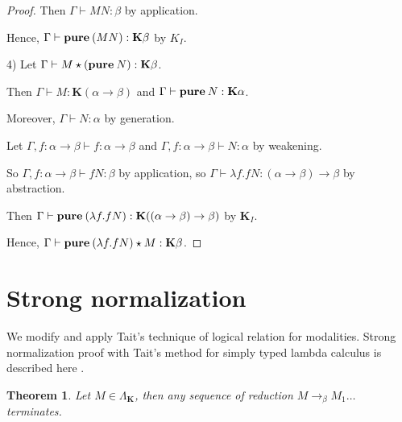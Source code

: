 \documentclass[a4paper]{article}
\newtheorem{theorem}{Theorem}
\begin{document}
\begin{proof}
  Then $\Gamma \vdash M N : \beta$ by application.

  Hence, $\Gamma \vdash {\bf pure \: } (M N) : \textbf{K}\beta$ by $K_I$.

\vspace{\baselineskip}

  4) Let $\Gamma \vdash M \star ({\bf pure \: } N) : \textbf{K}\beta$.

  Then $\Gamma \vdash M : \textbf{K}(\alpha \to \beta)$ and $\Gamma \vdash {\bf pure \: } N : \textbf{K}\alpha$.

  Moreover, $\Gamma \vdash N : \alpha$ by generation.

  Let $\Gamma, f : \alpha \to \beta \vdash f : \alpha \to \beta$ and $\Gamma, f : \alpha \to \beta \vdash N :
  \alpha$ by weakening.

  So $\Gamma, f : \alpha \to \beta \vdash f N : \beta$ by application, so $\Gamma \vdash \lambda f. f N :
  (\alpha \to \beta) \to \beta$ by abstraction.

  Then $\Gamma \vdash {\bf pure \: } (\lambda f. f N) : \textbf{K}((\alpha \to \beta) \to \beta)$ by $\textbf{K}_I$.

  Hence, $\Gamma \vdash {\bf pure \: } (\lambda f. f N) \star M : \textbf{K}\beta$.

  \end{proof}


  \vspace{\baselineskip}


\section{Strong normalization}

  We modify and apply Tait's technique of logical relation for modalities. Strong normalization proof with Tait's method for simply typed lambda calculus is described here \cite{Pierce}.


  \begin{theorem}

    Let $M \in \Lambda_{\textbf{K}}$, then any sequence of reduction $M \rightarrow_{\beta} M_1 \dots$ terminates.

  \end{theorem}
\end{document}
